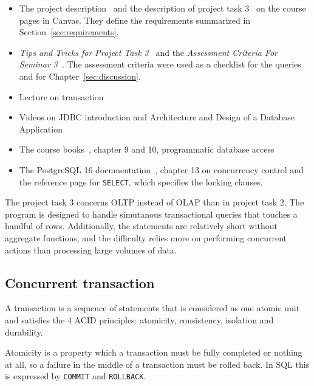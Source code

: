 \documentclass[a4paper]{scrartcl}
\renewcommand{\_}{\textunderscore\allowbreak}
\begin{document}
\begin{itemize}
  \item The project description~\cite{project} and the description of project task 3~\cite{task2} on the course pages in Canvas. They define the requirements summarized in Section~\ref{sec:requirements}.
  \item \textit{Tips and Tricks for Project Task 3}~\cite{tips2} and the \textit{Assessment Criteria For Seminar 3}~\cite{criteria2}. The assessment criteria were used as a checklist for the queries and for Chapter~\ref{sec:discussion}.
  \item Lecture on transaction
  \item Videos on JDBC introduction and Architecture and Design of a Database Application
  \item The course books~\cite{elmasri,silberschatz}, chapter 9 and 10, programmatic database access
  \item The PostgreSQL 16 documentation~\cite{postgresdocs}, chapter 13 on concurrency control and the reference page for \texttt{SELECT}, which specifies the locking clauses.
\end{itemize}

The project task 3 concerns OLTP instead of OLAP than in project task 2. The program is designed to handle simutanous transactional queries that touches a handful of rows. Additionally, the statements are relatively short without aggregate functions, and the difficulty relies more on performing concurrent actions than processing large volumes of data.

\subsection{Concurrent transaction}

A transaction is a sequence of statements that is considered as one atomic unit and satisfies the 4 ACID principles: atomicity, consistency, isolation and durability.

Atomicity is a property which a transaction must be fully completed or nothing at all, so a failure in the middle of a transaction must be rolled back. In SQL this is expressed by \texttt{COMMIT} and \texttt{ROLLBACK}.
\end{document}
